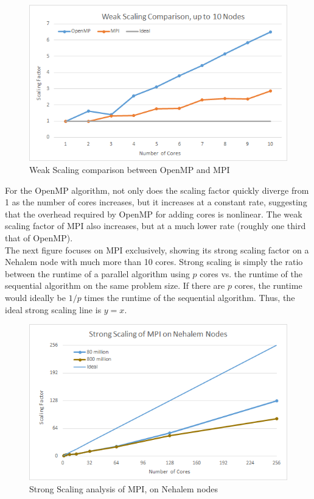 \documentclass{article}
\begin{document}
\begin{figure}[H]
	\centering

	\includegraphics[width=1.0\textwidth]{figures/weakscaling.png}

	\caption{Weak Scaling comparison between OpenMP and MPI}
\end{figure}

For the OpenMP algorithm, not only does the scaling factor quickly diverge from 1 as the number of cores increases, but it increases at a constant rate, suggesting that the overhead required by OpenMP for adding cores is nonlinear.  The weak scaling factor of MPI also increases, but at a much lower rate (roughly one third that of OpenMP). \\

The next figure focuses on MPI exclusively, showing its strong scaling factor on a Nehalem node with much more than 10 cores.  Strong scaling is simply the ratio between the runtime of a parallel algorithm using $p$ cores vs. the runtime of the sequential algorithm on the same problem size.  If there are $p$ cores, the runtime would ideally be $1/p$ times the runtime of the sequential algorithm.  Thus, the ideal strong scaling line is $y=x$.

\begin{figure}[H]
	\centering

	\includegraphics[width=1.0\textwidth]{figures/strongscaling.png}

	\caption{Strong Scaling analysis of MPI, on Nehalem nodes}
\end{figure}
\end{document}
